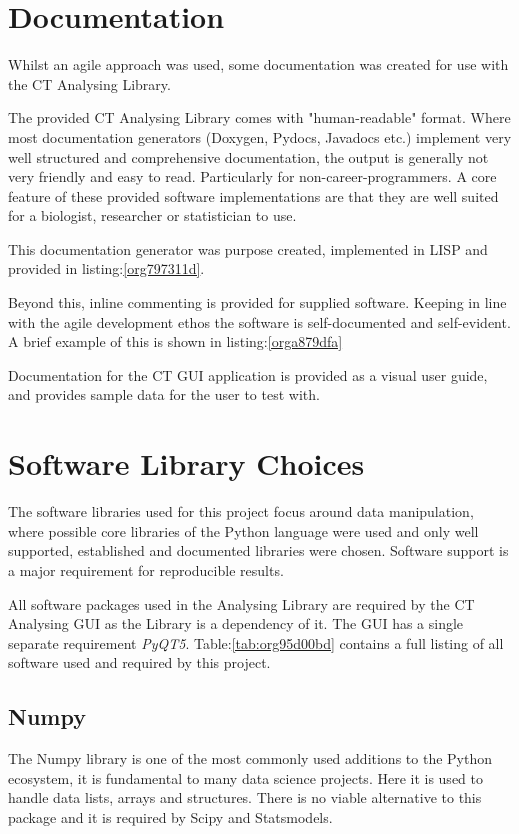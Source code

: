 \documentclass[11pt]{report}
\begin{document}
\section{Documentation}
\label{sec:org58b10b6}
Whilst an agile approach was used, some documentation was created for use with the CT Analysing Library.

The provided CT Analysing Library comes with "human-readable" format. Where most documentation generators (Doxygen, Pydocs, Javadocs etc.) implement very well structured and comprehensive documentation, the output is generally not very friendly and easy to read. Particularly for non-career-programmers. A core feature of these provided software implementations are that they are well suited for a biologist, researcher or statistician to use.

This documentation generator was purpose created, implemented in LISP and provided in listing:\ref{org797311d}.

Beyond this, inline commenting is provided for supplied software. Keeping in line with the agile development ethos the software is self-documented and self-evident. A brief example of this is shown in listing:\ref{orga879dfa}

Documentation for the CT GUI application is provided as a visual user guide, and provides sample data for the user to test with.
\section{Software Library Choices}
\label{sec:org8f6dbe9}
The software libraries used for this project focus around data manipulation, where possible core libraries of the Python language were used and only well supported, established and documented libraries were chosen. Software support is a major requirement for reproducible results.

All software packages used in the Analysing Library are required by the CT Analysing GUI as the Library is a dependency of it. The GUI has a single separate requirement \emph{PyQT5}.
Table:\ref{tab:org95d00bd} contains a full listing of all software used and required by this project.
\subsection{Numpy}
\label{sec:orgab8539b}
The Numpy library is one of the most commonly used additions to the Python ecosystem, it is fundamental to many data science projects. Here it is used to handle data lists, arrays and structures. There is no viable alternative to this package and it is required by Scipy and Statsmodels.
\end{document}

